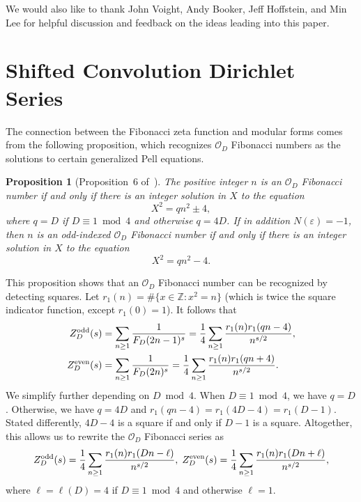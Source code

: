 \documentclass[11pt,reqno,oneside]{amsart}
\theoremstyle{plain}
\newtheorem{proposition}[theorem]{Proposition}
\theoremstyle{definition}
\newcommand{\Z}{\mathbb{Z}}
\newcommand{\calO}{\mathcal{O}}
\newcommand{\Zeven}{Z_D^{\textup{even}}}
\newcommand{\Zodd}{Z_D^{\textup{odd}}}
\begin{document}
We would also like to thank John Voight, Andy Booker, Jeff Hoffstein, and Min Lee
for helpful discussion and feedback on the ideas leading into this paper.


\section{Shifted Convolution Dirichlet Series}

The connection between the Fibonacci zeta function and modular forms comes from
the following proposition, which recognizes $\mathcal{O}_D$ Fibonacci numbers
as the solutions to certain generalized Pell equations.

\begin{proposition}[Proposition~6 of~\cite{akldwFibonacciGeneral}]\label{prop:pfib}
  The positive integer $n$ is an $\calO_D$ Fibonacci number if and only if
  there is an integer solution in $X$ to the equation
  \begin{equation}\label{eq:proppfib}
    X^2 = qn^2 \pm 4,
  \end{equation}
  where $q = D$ if $D \equiv 1 \bmod 4$ and otherwise $q = 4D$.
  If in addition $N(\varepsilon) = -1$, then $n$ is an odd-indexed $\calO_D$
  Fibonacci number if and only if there is an integer solution in $X$ to the equation
  \begin{equation}
    X^2 = qn^2 - 4.
  \end{equation}
\end{proposition}

This proposition shows that an $\calO_D$ Fibonacci number can
be recognized by detecting squares.
Let $r_1(n) = \#\{x \in \Z :  x^2 = n\}$ (which is twice the square indicator
function, except $r_1(0) = 1$).
It follows that
\begin{align}
  \Zodd(s)  & = \sum_{n \ge 1} \frac{1}{F_D(2n-1)^s}
  = \frac{1}{4} \sum_{n \ge 1} \frac{r_1(n)r_1(qn-4)}{n^{s/2}},
  \\
  \Zeven(s) & = \sum_{n \ge 1} \frac{1}{F_D(2n)^s}
  = \frac{1}{4} \sum_{n \ge 1} \frac{r_1(n)r_1(qn+4)}{n^{s/2}}.
\end{align}
We simplify further depending on $D \bmod 4$.
When $D \equiv 1 \bmod 4$, we have $q = D$.
Otherwise, we have $q = 4D$ and $r_1(qn - 4) = r_1(4D - 4) = r_1(D - 1)$.
Stated differently, $4D - 4$ is a square if and only if $D - 1$ is a square.
Altogether, this allows us to rewrite the $\mathcal{O}_D$ Fibonacci series as
\begin{align}\label{eq:basic_modular}
  \Zodd(s) = \frac{1}{4} \sum_{n \ge 1} \frac{r_1(n)r_1(Dn-\ell)}{n^{s/2}},
  \; \Zeven(s) = \frac{1}{4} \sum_{n \ge 1} \frac{r_1(n)r_1(Dn+\ell)}{n^{s/2}},
\end{align}
where $\ell = \ell(D) = 4$ if $D \equiv 1 \bmod 4$ and otherwise $\ell = 1$.
\end{document}
